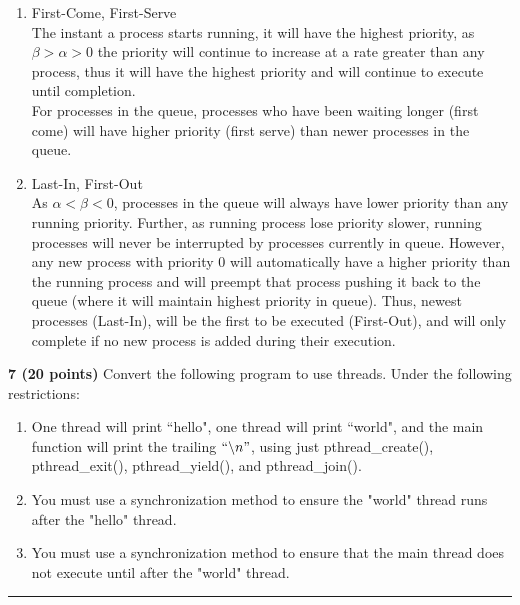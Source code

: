 \documentclass[12pt]{jhwhw}
\begin{document}
	\begin{addmargin}[1em]{}
		\begin{enumerate}
			\item
				First-Come, First-Serve \\
				The instant a process starts running, it will have the highest priority,
				as $\beta > \alpha > 0$ the priority will continue to increase at a rate
				greater than any process, thus it will have the highest priority 
				and will continue to execute until completion. \\
				For processes in the queue, processes who have been waiting longer 
				(first come) will have higher priority (first serve) than newer processes
				in the queue.
			\item
				Last-In, First-Out \\
				As $\alpha < \beta < 0$, processes in the queue will always
				have lower priority than any running priority. Further, as 
				running process lose priority slower, running processes will never
				be interrupted by processes currently in queue. However, any new process
				with priority 0 will automatically have a higher priority than the running
				process and will preempt that process pushing it back to the queue 
				(where it will maintain highest priority in queue).
				Thus, newest processes (Last-In), will be the first to be executed 
				(First-Out), and will only complete if no new process is added
				during their execution.
		\end{enumerate}
	\end{addmargin}

\textbf{7 (20 points)} Convert the following program to use threads.
	Under the following restrictions:
	\begin{enumerate}
		\item One thread will print ``hello", one thread will print ``world", and the
			main function will print the trailing $``\backslash n"$, using just
			pthread_create(), pthread_exit(), pthread_yield(), and
			pthread_join().
		\item You must use a synchronization method to ensure the "world" thread
			runs after the "hello" thread.
		\item You must use a synchronization method to ensure that the main
			thread does not execute until after the "world" thread.
	\end{enumerate}

\textcolor[RGB]{240,240,240}{\rule{\textwidth}{0.5pt}}\bigbreak
\inputminted{c}{7.c}
\end{document}
